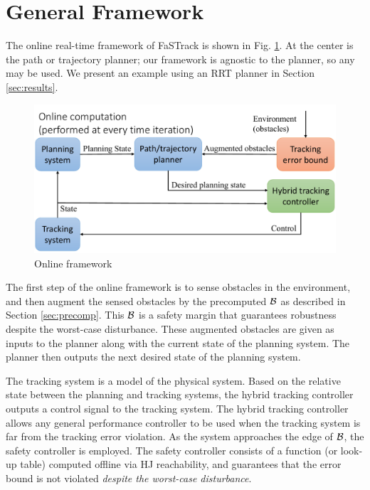 \section{General Framework \label{sec:framework}}
The online real-time framework of FaSTrack is shown in Fig. \ref{fig:fw_online}. At the center is the path or trajectory planner; our framework is agnostic to the planner, so any may be used. We present an example using an RRT planner in Section \ref{sec:results}.\\
\begin{figure}[]
  \centering
	\includegraphics[width=0.9\columnwidth]{fig/framework_online}
	\caption{Online framework}
	\label{fig:fw_online}
	\vspace{-.1in}
\end{figure}
The first step of the online framework is to sense obstacles in the environment, and then augment the sensed obstacles by the precomputed $\mathcal B$ as described in Section \ref{sec:precomp}. This $\mathcal B$ is a safety margin that guarantees robustness despite the worst-case disturbance. These augmented obstacles are given as inputs to the planner along with the current state of the planning system. The planner then outputs the next desired state of the planning system. 

The tracking system is a model of the physical system. Based on the relative state between the planning and tracking systems, the hybrid tracking controller outputs a control signal to the tracking system. The hybrid tracking controller allows any general performance controller to be used when the tracking system is far from the tracking error violation. As the system approaches the edge of $\mathcal B$, the safety controller is employed. The safety controller consists of a function (or look-up table) computed offline via HJ reachability, and guarantees that the error bound is not violated \textit{despite the worst-case disturbance}.

